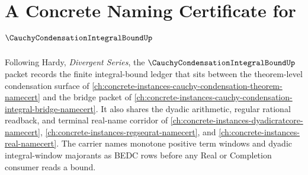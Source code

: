 \chapter{A Concrete Naming Certificate for $\CauchyCondensationIntegralBoundUp$}
\label{ch:concrete-instances-cauchy-condensation-integral-bound-namecert}

Following Hardy, \emph{Divergent Series}, the $\CauchyCondensationIntegralBoundUp$ packet records the finite integral-bound ledger that sits between the theorem-level condensation surface of \autoref{ch:concrete-instances-cauchy-condensation-theorem-namecert} and the bridge packet of \autoref{ch:concrete-instances-cauchy-condensation-integral-bridge-namecert}. It also shares the dyadic arithmetic, regular rational readback, and terminal real-name corridor of \autoref{ch:concrete-instances-dyadicratcore-namecert}, \autoref{ch:concrete-instances-regseqrat-namecert}, and \autoref{ch:concrete-instances-real-namecert}. The carrier names monotone positive term windows and dyadic integral-window majorants as BEDC rows before any Real or Completion consumer reads a bound.

